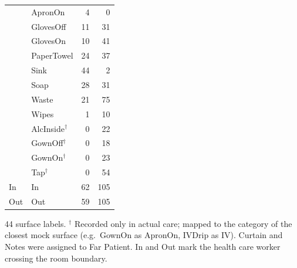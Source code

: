 \begin{table}[htbp]
\begin{tabular*}{\linewidth}{@{\extracolsep{\fill}}llrr}
 & ApronOn & 4 & 0 \\
 & GlovesOff & 11 & 31 \\
 & GlovesOn & 10 & 41 \\
 & PaperTowel & 24 & 37 \\
 & Sink & 44 & 2 \\
 & Soap & 28 & 31 \\
 & Waste & 21 & 75 \\
 & Wipes & 1 & 10 \\
 & AlcInside$^\dagger$ & 0 & 22 \\
 & GownOff$^\dagger$ & 0 & 18 \\
 & GownOn$^\dagger$ & 0 & 23 \\
 & Tap$^\dagger$ & 0 & 54 \\
\addlinespace
In & In & 62 & 105 \\
\addlinespace
Out & Out & 59 & 105 \\
\bottomrule
\end{tabular*}
\par\smallskip
\begin{minipage}{\linewidth}\footnotesize
44 surface labels. $^\dagger$ Recorded only in actual care; mapped to the category of the closest mock surface (e.g.\ GownOn as ApronOn, IVDrip as IV). Curtain and Notes were assigned to Far Patient. In and Out mark the health care worker crossing the room boundary.
\end{minipage}
\end{table}
